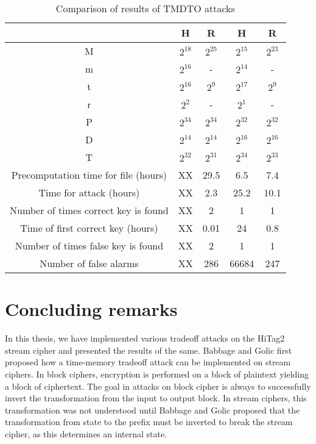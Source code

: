\begin{table}[ht!]
\begin{center}
\begin{tabular}{|c|c c||c c|}
\hline
																				&	H							&	R								&	H								& R							\\ \hline \hline
M																				&	$2^{18}$			&	$2^{25}$				&	$2^{15}$				& $2^{23}$			\\ \hline 
m																				&	$2^{16}$			&		-							&	$2^{14}$				& 	-						\\ \hline 
t																				&	$2^{16}$			&	$2^{9}$					&	$2^{17}$				& $2^{9}$				\\ \hline 
r																				&	$2^{2}$				&		-							&	$2^{1}$					& 	-						\\ \hline 
P																				&	$2^{34}$			&	$2^{34}$				&	$2^{32}$				& $2^{32}$			\\ \hline 
D																				&	$2^{14}$			&	$2^{14}$				&	$2^{16}$				& $2^{16}$			\\ \hline \hline
T																				&	$2^{32}$			&	$2^{31}$				&	$2^{34}$				& $2^{33}$			\\ \hline \hline
Precomputation time for file (hours)		&	XX 	 					&	29.5						&	6.5							&	7.4						\\ \hline
Time for attack	(hours)									&	XX 	 					&	2.3							&	25.2						&	10.1					\\ \hline
Number of times correct key is found 		&	XX 	 					&	2 							&	1 							&	1 						\\ \hline
Time of first correct key (hours)				&	XX 	 					&	0.01						&	24							&	0.8						\\ \hline
Number of times false key is found			&	XX 	 					&	2 							&	1 							&	1 						\\ \hline
Number of false alarms									&	XX 	 					&	286							&	66684						&	247						\\ \hline
\end{tabular}
\end{center} 
\caption{Comparison of results of TMDTO attacks}
\label{tab:comparison-results-hellman-rainbow}
\end{table}

\section{Concluding remarks}

In this thesis, we have implemented various tradeoff attacks on the HiTag2 stream cipher and presented the results of the same. Babbage and Golic first proposed how a time-memory tradeoff attack can be implemented on stream ciphers. In block ciphers, encryption is performed on a block of plaintext yielding a block of ciphertext. The goal in attacks on block cipher is always to successfully invert the transformation from the input to output block. In stream ciphers, this transformation was not understood until Babbage and Golic proposed that the transformation from state to the prefix must be inverted to break the stream cipher, as this determines an internal state. 

